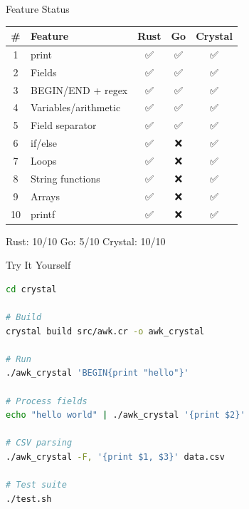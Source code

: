\documentclass[aspectratio=169]{beamer}
\begin{document}
\begin{frame}{Feature Status}

\begin{table}
\small
\begin{tabular}{clccc}
\toprule
\# & Feature & Rust & Go & Crystal \\
\midrule
1 & print & ✅ & ✅ & ✅ \\
2 & Fields & ✅ & ✅ & ✅ \\
3 & BEGIN/END + regex & ✅ & ✅ & ✅ \\
4 & Variables/arithmetic & ✅ & ✅ & ✅ \\
5 & Field separator & ✅ & ✅ & ✅ \\
6 & if/else & ✅ & ❌ & ✅ \\
7 & Loops & ✅ & ❌ & ✅ \\
8 & String functions & ✅ & ❌ & ✅ \\
9 & Arrays & ✅ & ❌ & ✅ \\
10 & printf & ✅ & ❌ & ✅ \\
\bottomrule
\end{tabular}
\end{table}

\vspace{1em}

\begin{center}
Rust: 10/10 \qquad Go: 5/10 \qquad Crystal: 10/10
\end{center}

\end{frame}

\begin{frame}[fragile]{Try It Yourself}

\begin{lstlisting}[language=bash]
cd crystal

# Build
crystal build src/awk.cr -o awk_crystal

# Run
./awk_crystal 'BEGIN{print "hello"}'

# Process fields
echo "hello world" | ./awk_crystal '{print $2}'

# CSV parsing
./awk_crystal -F, '{print $1, $3}' data.csv

# Test suite
./test.sh
\end{lstlisting}

\end{frame}
\end{document}
